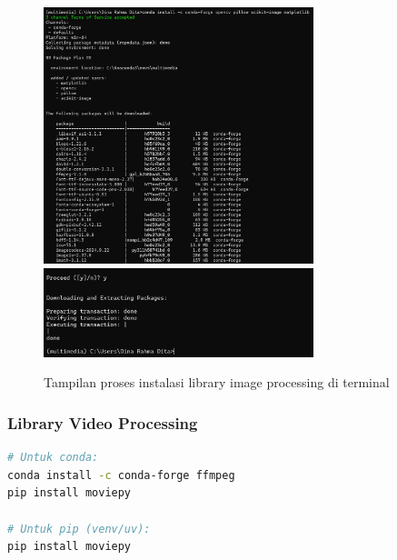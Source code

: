 \documentclass[11pt,a4paper]{article}
\begin{document}
\begin{figure}[H]
    \centering
    \includegraphics[width=0.7\textwidth]{Figure/ss/5.png}
    \includegraphics[width=0.7\textwidth]{Figure/ss/6.png}
    \caption{Tampilan proses instalasi library image processing di terminal}
    \label{fig:image_library}
\end{figure}

\subsubsection{Library Video Processing}
\begin{lstlisting}[language=bash, caption=Instalasi library video]
# Untuk conda:
conda install -c conda-forge ffmpeg
pip install moviepy

# Untuk pip (venv/uv):
pip install moviepy
\end{lstlisting}
\end{document}
